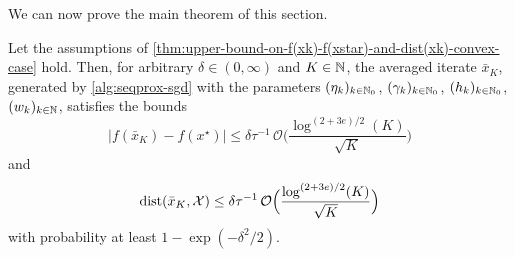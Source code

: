 We can now prove the main theorem of this section.
\begin{theorem}
    \label{thm:convergence-with-high-probability-convex-case}
    Let the assumptions of \cref{thm:upper-bound-on-f(xk)-f(xstar)-and-dist(xk)-convex-case} hold.
    Then, for arbitrary $\delta\in(0,\infty)$ and $K\in\mathbb{N}$, the
    averaged iterate $\bar{x}_K$, generated by \cref{alg:seqprox-sgd}
    with the parameters $(\eta_k)_{k\in\mathbb{N}_{0}}$,
    $(\gamma_k)_{k\in\mathbb{N}_0}$, $(h_k)_{k\in\mathbb{N}_0}$, $(w_k)_{k\in\mathbb{N}}$, satisfies the
    bounds
    \[
        |f(\bar{x}_K) - f(x^\star)|
        \leq
        \delta \tau^{-1} \, \mathcal{O}\Big( \frac{\log^{(2 + 3e) / 2}(K)}{\sqrt{K}} \Big)
    \]
    and
    \[
        \operatorname{dist}(\bar{x}_K, \mathcal{X})
        \leq
        \delta \tau^{-1} \, \mathcal{O}\Big( \frac{\log^{(2 + 3e) / 2}(K)}{\sqrt{K}} \Big)
    \]
    with probability at least $1 - \exp(-\delta^2 / 2)$.
\end{theorem}
